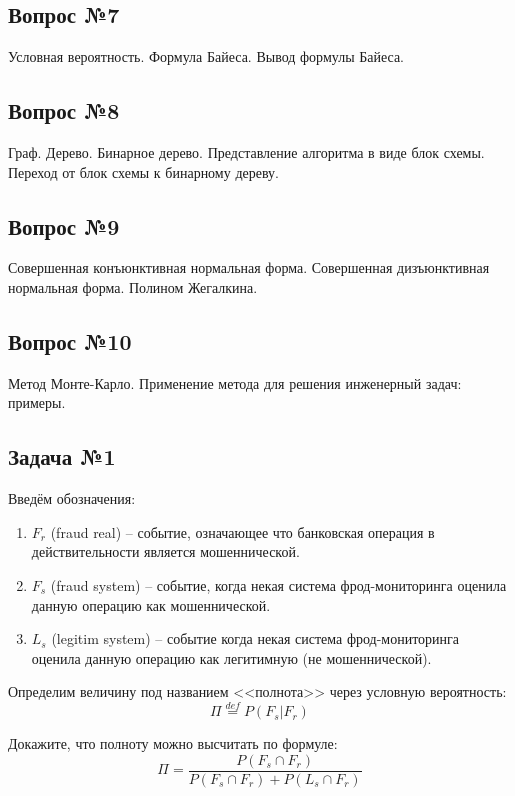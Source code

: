 \documentclass[english,russian,12pt]{article}
\begin{document}
\subsection*{Вопрос №7}
Условная вероятность. 
Формула Байеса. 
Вывод формулы Байеса.

\subsection*{Вопрос №8}
Граф. Дерево. Бинарное дерево.
Представление алгоритма в виде блок схемы.
Переход от блок схемы к бинарному дереву. 


\subsection*{Вопрос №9}
Совершенная конъюнктивная нормальная форма.
Совершенная дизъюнктивная нормальная форма.
Полином Жегалкина.

\subsection*{Вопрос №10}
Метод Монте-Карло.
Применение метода для решения инженерный задач: примеры.

\newpage
\subsection*{Задача №1}
Введём обозначения:
\begin{enumerate}
	\item $F_r$ (fraud real) -- событие, означающее что банковская операция в действительности является мошеннической. 
	\item $F_s$ (fraud system) -- событие, когда некая система фрод-мониторинга оценила данную операцию как мошеннической.
	\item $L_s$ (legitim system) -- событие когда некая система фрод-мониторинга оценила данную операцию как легитимную (не мошеннической).
\end{enumerate}

Определим величину под названием <<полнота>> через условную вероятность:
\begin{equation}
\Pi \stackrel{def}{=} P(F_s | F_r)
\end{equation}

Докажите, что полноту можно высчитать по формуле:
\begin{equation}
\Pi = \frac{P(F_s \cap F_r)}{P(F_s \cap F_r) + P(L_s \cap F_r)}
\end{equation}
\end{document}
